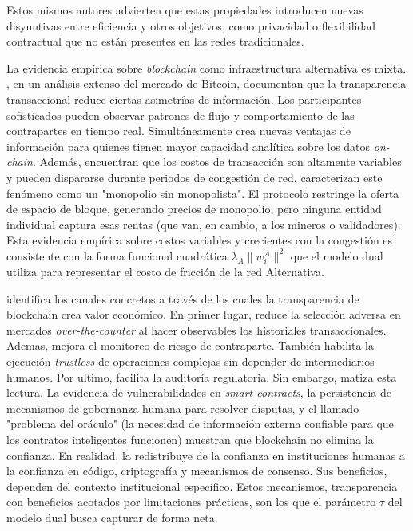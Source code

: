 Estos mismos autores advierten que estas propiedades introducen nuevas disyuntivas entre eficiencia y otros
objetivos, como privacidad o flexibilidad contractual que no están presentes en
las redes tradicionales.

La evidencia empírica sobre \textit{blockchain} como infraestructura alternativa es
mixta. , en un análisis extenso del mercado de
Bitcoin, documentan que la transparencia transaccional reduce ciertas asimetrías
de información. Los participantes sofisticados pueden observar patrones de flujo
y comportamiento de las contrapartes en tiempo real. Simultáneamente crea
nuevas ventajas de información para quienes tienen mayor capacidad analítica
sobre los datos \textit{on-chain}. Además, encuentran que los costos de
transacción son altamente variables y pueden dispararse durante periodos de
congestión de red.  caracterizan este fenómeno
como un "monopolio sin monopolista". El protocolo restringe la oferta de
espacio de bloque, generando precios de monopolio, pero ninguna entidad
individual captura esas rentas (que van, en cambio, a los mineros o validadores).
Esta evidencia empírica sobre costos variables y crecientes con la congestión es
consistente con la forma funcional cuadrática $\lambda_A \|w_i^A\|^2$ que el
modelo dual utiliza para representar el costo de fricción de la red Alternativa.

 identifica los canales concretos a través de
los cuales la transparencia de blockchain crea valor económico. En primer lugar, reduce la
selección adversa en mercados \textit{over-the-counter} al hacer observables
los historiales transaccionales. Ademas, mejora el monitoreo de riesgo de contraparte.
También habilita la ejecución \textit{trustless} de operaciones complejas sin depender
de intermediarios humanos. Por ultimo, facilita la auditoría regulatoria. Sin embargo,
 matiza esta lectura. La evidencia de vulnerabilidades
en \textit{smart contracts}, la persistencia de mecanismos de gobernanza humana
para resolver disputas, y el llamado "problema del oráculo" (la necesidad de
información externa confiable para que los contratos inteligentes funcionen)
muestran que blockchain no elimina la confianza. En realidad, la redistribuye de
la confianza en instituciones humanas a la confianza en código, criptografía y
mecanismos de consenso. Sus beneficios, dependen del contexto institucional
específico. Estos mecanismos, transparencia con beneficios acotados por
limitaciones prácticas, son los que el parámetro $\tau$ del modelo dual busca
capturar de forma neta.

